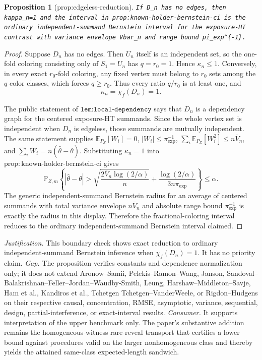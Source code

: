 \documentclass{article}
\newtheorem{proposition}{Proposition}
\begin{document}
\begin{proposition}[prop:edgeless-reduction]\label{prop:edgeless-reduction}
\texttt{If D\_n has no edges, then kappa\_n=1 and the interval in prop:known-holder-bernstein-ci is the ordinary independent-summand Bernstein interval for the exposure-HT contrast with variance envelope Vbar\_n and range bound pi\_exp\textasciicircum{}\{-1\}.}
\end{proposition}
\begin{proof}
Suppose \(D_n\) has no edges. Then \(U_n\) itself is an independent set, so the one-fold coloring consisting only of \(S_1=U_n\) has \(q=r_0=1\). Hence \(\kappa_n\le1\). Conversely, in every exact \(r_0\)-fold coloring, any fixed vertex must belong to \(r_0\) sets among the \(q\) color classes, which forces \(q\ge r_0\). Thus every ratio \(q/r_0\) is at least one, and
\[
\kappa_n=\chi_f(D_n)=1.
\]

The public statement of \(\texttt{lem:local-dependency}\) says that \(D_n\) is a dependency graph for the centered exposure-HT summands. Since the whole vertex set is independent when \(D_n\) is edgeless, those summands are mutually independent. The same statement supplies \(\mathbb E_{P_Z}[W_i]=0\), \(|W_i|\le\pi_{\exp}^{-1}\), \(\sum_i\mathbb E_{P_Z}[W_i^2]\le n\overline V_n\), and \(\sum_iW_i=n(\widehat\theta-\theta)\). Substituting \(\kappa_n=1\) into \(\mathrm{prop{:}known\mbox{-}holder\mbox{-}bernstein\mbox{-}ci}\) gives
\[
\mathbb P_{Z,m}\!\left\{
|\widehat\theta-\theta|>
\sqrt{\frac{2\overline V_n\log(2/\alpha)}{n}}
+\frac{\log(2/\alpha)}{3n\pi_{\exp}}
\right\}\le\alpha.
\]
The generic independent-summand Bernstein radius for an average of centered summands with total variance envelope \(n\overline V_n\) and absolute range bound \(\pi_{\exp}^{-1}\) is exactly the radius in this display. Therefore the fractional-coloring interval reduces to the ordinary independent-summand Bernstein interval claimed.
\end{proof}
\par\smallskip\noindent \textit{Justification.} This boundary check shows exact reduction to ordinary independent-summand Bernstein inference when \(\chi_f(D_n)=1\). It has no priority claim. \textit{Gap.} The proposition verifies constants and dependence normalization only; it does not extend Aronow--Samii, Pelekis--Ramon--Wang, Janson, Sandoval--Balakrishnan--Feller--Jordan--Waudby-Smith, Leung, Harshaw--Middleton--Savje, Ham et al., Kandiros et al., Tchetgen Tchetgen--VanderWeele, or Rigdon--Hudgens on their respective causal, concentration, RMSE, asymptotic, variance, sequential, design, partial-interference, or exact-interval results. \textit{Consumer.} It supports interpretation of the upper benchmark only. The paper's substantive addition remains the homogeneous-witness rare-reveal transport that certifies a lower bound against procedures valid on the larger nonhomogeneous class and thereby yields the attained same-class expected-length sandwich.
\end{document}
